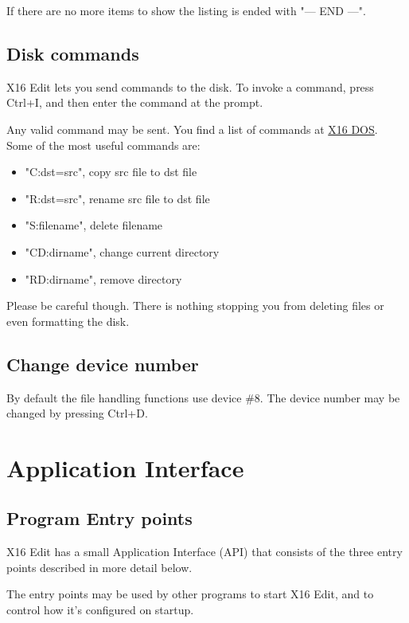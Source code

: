 \documentclass{article}
\begin{document}
    If there are no more items to show the listing is ended with "--- END ---".


    \subsection{Disk commands}

    X16 Edit lets you send commands to the disk. To invoke a command, press Ctrl+I, and then enter
    the command at the prompt.

    Any valid command may be sent. You find a list of commands at 
    \href{https://github.com/commanderx16/x16-rom/tree/master/dos}{X16 DOS}. Some of the most useful commands are:

     \begin{itemize} 
            \item "C:dst=src", copy src file to dst file
            \item "R:dst=src", rename src file to dst file
            \item "S:filename", delete filename
            \item "CD:dirname", change current directory
            \item "RD:dirname", remove directory
    \end{itemize}
    
    Please be careful though. There is nothing stopping you from deleting files or even formatting the
    disk.


    \subsection{Change device number}

    By default the file handling functions use device \#8. The device
    number may be changed by pressing Ctrl+D.

\section{Application Interface}

    \subsection{Program Entry points}

        X16 Edit has a small Application Interface (API) that consists of the three
        entry points described in more detail below.

        The entry points may be used by other programs to start X16 Edit, and to
        control how it's configured on startup.
\end{document}
